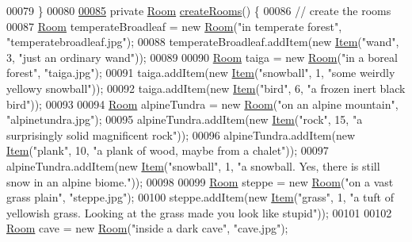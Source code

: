 \begin{DoxyCode}
00079     \}
00080 
\hypertarget{GameEngine_8java_source_l00085}{}\hyperlink{classGameEngine_a9410d92f7d0e6820059b1d07da364b09}{00085}     \textcolor{keyword}{private} \hyperlink{classRoom}{Room} \hyperlink{classGameEngine_a9410d92f7d0e6820059b1d07da364b09}{createRooms}() \{
00086         \textcolor{comment}{// create the rooms}
00087         \hyperlink{classRoom}{Room} temperateBroadleaf = \textcolor{keyword}{new} \hyperlink{classRoom}{Room}(\textcolor{stringliteral}{"in temperate forest"}, \textcolor{stringliteral}{"temperatebroadleaf.jpg"});
00088         temperateBroadleaf.addItem(\textcolor{keyword}{new} \hyperlink{classItem}{Item}(\textcolor{stringliteral}{"wand"}, 3, \textcolor{stringliteral}{"just an ordinary wand"}));
00089 
00090         \hyperlink{classRoom}{Room} taiga = \textcolor{keyword}{new} \hyperlink{classRoom}{Room}(\textcolor{stringliteral}{"in a boreal forest"}, \textcolor{stringliteral}{"taiga.jpg"});
00091         taiga.addItem(\textcolor{keyword}{new} \hyperlink{classItem}{Item}(\textcolor{stringliteral}{"snowball"}, 1, \textcolor{stringliteral}{"some weirdly yellowy snowball"}));
00092         taiga.addItem(\textcolor{keyword}{new} \hyperlink{classItem}{Item}(\textcolor{stringliteral}{"bird"}, 6, \textcolor{stringliteral}{"a frozen inert black bird"}));
00093 
00094         \hyperlink{classRoom}{Room} alpineTundra = \textcolor{keyword}{new} \hyperlink{classRoom}{Room}(\textcolor{stringliteral}{"on an alpine mountain"}, \textcolor{stringliteral}{"alpinetundra.jpg"});
00095         alpineTundra.addItem(\textcolor{keyword}{new} \hyperlink{classItem}{Item}(\textcolor{stringliteral}{"rock"}, 15, \textcolor{stringliteral}{"a surprisingly solid magnificent rock"}));
00096         alpineTundra.addItem(\textcolor{keyword}{new} \hyperlink{classItem}{Item}(\textcolor{stringliteral}{"plank"}, 10, \textcolor{stringliteral}{"a plank of wood, maybe from a chalet"}));
00097         alpineTundra.addItem(\textcolor{keyword}{new} \hyperlink{classItem}{Item}(\textcolor{stringliteral}{"snowball"}, 1, \textcolor{stringliteral}{"a snowball. Yes, there is still snow in an alpine
       biome."}));
00098 
00099         \hyperlink{classRoom}{Room} steppe = \textcolor{keyword}{new} \hyperlink{classRoom}{Room}(\textcolor{stringliteral}{"on a vast grass plain"}, \textcolor{stringliteral}{"steppe.jpg"});
00100         steppe.addItem(\textcolor{keyword}{new} \hyperlink{classItem}{Item}(\textcolor{stringliteral}{"grass"}, 1, \textcolor{stringliteral}{"a tuft of yellowish grass. Looking at the grass made you
       look like stupid"}));
00101 
00102         \hyperlink{classRoom}{Room} cave = \textcolor{keyword}{new} \hyperlink{classRoom}{Room}(\textcolor{stringliteral}{"inside a dark cave"}, \textcolor{stringliteral}{"cave.jpg"});

\end{DoxyCode}
